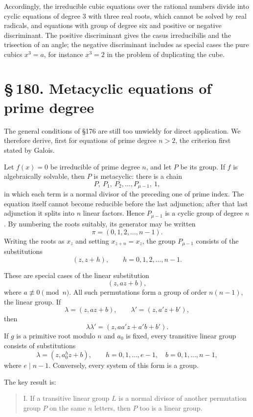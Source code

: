 \documentclass[11pt]{article}
\providecommand{\sect}[2]{\section*{\S\,#1. #2}}
\begin{document}
Accordingly, the irreducible cubic equations over the rational numbers divide into cyclic equations of degree $3$ with three real roots, which cannot be solved by real radicals, and equations with group of degree six and positive or negative discriminant. The positive discriminant gives the casus irreducibilis and the trisection of an angle; the negative discriminant includes as special cases the pure cubics $x^3=a$, for instance $x^3=2$ in the problem of duplicating the cube.

\sect{180}{Metacyclic equations of prime degree}

The general conditions of §176 are still too unwieldy for direct application. We therefore derive, first for equations of prime degree $n>2$, the criterion first stated by Galois.

Let $f(x)=0$ be irreducible of prime degree $n$, and let $P$ be its group. If $f$ is algebraically solvable, then $P$ is metacyclic: there is a chain
\[
  P,\ P_1,\ P_2,\ldots, P_{\mu-1},\ 1,                         \tag{1}
\]
in which each term is a normal divisor of the preceding one of prime index. The equation itself cannot become reducible before the last adjunction; after that last adjunction it splits into $n$ linear factors. Hence $P_{\mu-1}$ is a cyclic group of degree $n$. By numbering the roots suitably, its generator may be written
\[
  \pi=(0,1,2,\ldots,n-1).
\]
Writing the roots as $x_z$ and setting $x_{z+n}=x_z$, the group $P_{\mu-1}$ consists of the substitutions
\[
  (z,z+h),\qquad h=0,1,2,\ldots,n-1.                            \tag{2}
\]

These are special cases of the linear substitution
\[
  (z,az+b),                                                     \tag{3}
\]
where $a\not\equiv0\pmod n$. All such permutations form a group of order $n(n-1)$, the linear group. If
\[
  \lambda=(z,az+b),\qquad \lambda'=(z,a'z+b'),
\]
then
\[
  \lambda\lambda'=(z,aa'z+a'b+b').                              \tag{4}
\]
If $g$ is a primitive root modulo $n$ and $a_0$ is fixed, every transitive linear group consists of substitutions
\[
  \lambda=(z,a_0^h z+b),\qquad h=0,1,\ldots,e-1,
  \quad b=0,1,\ldots,n-1,                                      \tag{5}
\]
where $e\mid n-1$. Conversely, every system of this form is a group.

The key result is:
\begin{quote}
I. If a transitive linear group $L$ is a normal divisor of another permutation group $P$ on the same $n$ letters, then $P$ too is a linear group.
\end{quote}
\end{document}

